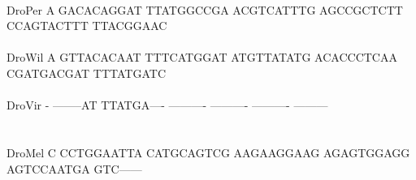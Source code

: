 \documentclass[11pt,twoside,reqno,a4paper]{article}
\begin{document}
{\hspace*{7\charwidth}\hspace*{1\charwidth}\hspace*{1\charwidth}\hspace*{1\charwidth}\hspace*{1\charwidth}\hspace*{1\charwidth}\hspace*{1\charwidth}\\
DroPer	A	GACACAGGAT	TTATGGCCGA	ACGTCATTTG	AGCCGCTCTT	CCAGTACTTT	TTACGGAAC\\
\hspace*{7\charwidth}\hspace*{1\charwidth}\hspace*{1\charwidth}\hspace*{1\charwidth}\hspace*{1\charwidth}\hspace*{1\charwidth}\hspace*{1\charwidth}\\
DroWil	A	GTTACACAAT	TTTCATGGAT	ATGTTATATG	ACACCCTCAA	CGATGACGAT	TTTATGATC\\
\hspace*{7\charwidth}\hspace*{1\charwidth}\hspace*{1\charwidth}\hspace*{1\charwidth}\hspace*{1\charwidth}\hspace*{1\charwidth}\hspace*{1\charwidth}\\
DroVir	-	--------AT	TTATGA----	----------	----------	----------	---------\\
\hspace*{7\charwidth}\hspace*{1\charwidth}\hspace*{1\charwidth}\hspace*{1\charwidth}\hspace*{1\charwidth}\hspace*{1\charwidth}\hspace*{1\charwidth}\\
\\
DroMel	C	CCTGGAATTA	CATGCAGTCG	AAGAAGGAAG	AGAGTGGAGG	AGTCCAATGA	GTC------\\
\hspace*{7\charwidth}\hspace*{1\charwidth}\hspace*{1\charwidth}\hspace*{1\charwidth}\hspace*{1\charwidth}\hspace*{1\charwidth}\hspace*{1\charwidth}\\
}
\end{document}
